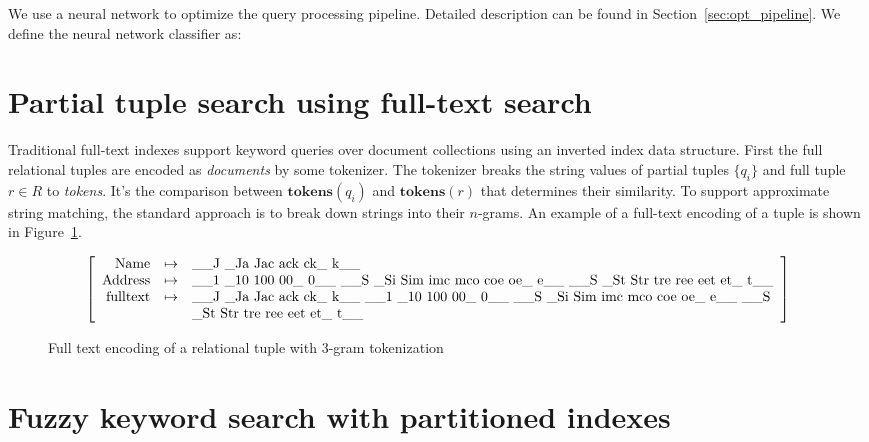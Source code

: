 \documentclass[conference]{IEEEtran}
\newtheorem{definition}{Definition}
\begin{document}
We use a neural network to optimize the query processing pipeline. Detailed
description can be found in  Section~\ref{sec:opt_pipeline}. We define the
neural network classifier as:


\section{Partial tuple search using full-text search}
\label{sec:search_fulltext_index}
Traditional full-text indexes support keyword queries
over document collections using an inverted index data structure.  First the full relational
tuples are encoded as {\em documents} by some tokenizer.  The tokenizer breaks the string values of partial tuples
$\{q_i\}$ and full tuple $r\in R$ to {\em tokens}.  It's the comparison between $\mathbf{tokens}(q_i)$ and $\mathbf{tokens}(r)$
that determines their similarity.  To support approximate string matching, the standard approach \cite{kim2007n,kondrak2005n}
is to break down strings into their $n$-grams.  An example of a full-text encoding of a tuple is shown in Figure~\ref{fig:encoding}.

\begin{figure}[t]
	\label{fig:encoding}
$$
\left[\begin{array}{rcl}
\mathrm{Name} & \mapsto & \makebox{\_\_J \_Ja Jac ack ck\_ k\_\_} \\
\mathrm{Address} & \mapsto & \makebox{\_\_1 \_10 100 00\_ 0\_\_ \_\_S \_Si Sim imc mco coe oe\_ e\_\_ \_\_S \_St Str tre ree eet et\_ t\_\_} \\
\mathrm{fulltext} & \mapsto & \makebox{\_\_J \_Ja Jac ack ck\_ k\_\_ \_\_1 \_10 100 00\_ 0\_\_ \_\_S \_Si Sim imc mco coe oe\_ e\_\_ \_\_S} \\ 
 & & \makebox{\_St Str tre ree eet et\_ t\_\_}\\
\end{array}\right]
$$
	\caption{Full text encoding of a relational tuple with 3-gram tokenization}
\end{figure}

\section{Fuzzy keyword search with partitioned indexes}
\end{document}
